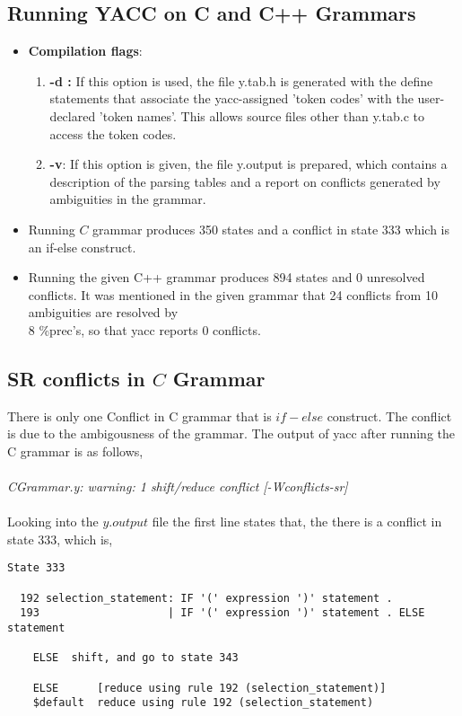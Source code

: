 \documentclass[english,a4paper,12pt]{article}
\begin{document}
\subsection{Running YACC on C and C++ Grammars}
\begin{itemize}
    \item \textbf{Compilation flags}:
    \begin{enumerate}
        \item \textbf{-d :} If this option is used, the file y.tab.h is generated with the define statements that associate the yacc-assigned 'token codes' with the user-declared 'token names'. This allows source files other than y.tab.c to access the token codes. 
        \item \textbf{-v}: If this option is given, the file y.output is prepared, which contains a description of the parsing tables and a report on conflicts generated by ambiguities in the grammar.
    \end{enumerate}
    \item Running $C$ grammar produces 350 states and a conflict in state 333 which is an if-else construct.
    \item Running the given C++ grammar produces 894 states and 0 unresolved conflicts. It was mentioned in the given grammar that 24 conflicts from 10 ambiguities are resolved by\\ 8 \%prec's, so that yacc reports 0 conflicts.

\end{itemize}
   \subsection{\textbf{SR conflicts in $C$ Grammar }} 
   There is only one Conflict in C grammar that is $if-else$ construct. The conflict is due to the ambigousness of the grammar. The output of yacc after running the C grammar is as follows,\\ ~ \\ 
  \textit{CGrammar.y: warning: 1 shift/reduce conflict [-Wconflicts-sr]
\\~\\}
Looking into the $y.output$ file the first line states that, the there is a conflict in state 333, which is,

\begin{verbatim}
State 333

  192 selection_statement: IF '(' expression ')' statement .
  193                    | IF '(' expression ')' statement . ELSE statement

    ELSE  shift, and go to state 343

    ELSE      [reduce using rule 192 (selection_statement)]
    $default  reduce using rule 192 (selection_statement)
    
\end{verbatim} 
\end{document}
